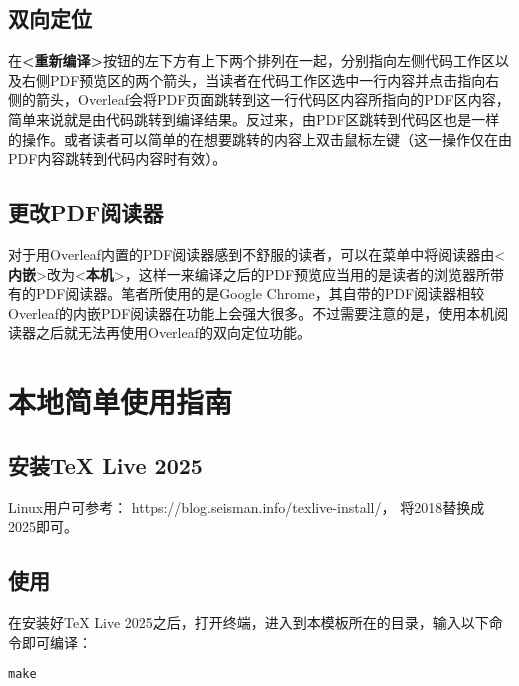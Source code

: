 \subsection{双向定位}

在\textbf{<重新编译>}按钮的左下方有上下两个排列在一起，分别指向左侧代码工作区以及右侧PDF预览区的两个箭头，当读者在代码工作区选中一行内容并点击指向右侧的箭头，Overleaf会将PDF页面跳转到这一行代码区内容所指向的PDF区内容，简单来说就是由代码跳转到编译结果。反过来，由PDF区跳转到代码区也是一样的操作。或者读者可以简单的在想要跳转的内容上双击鼠标左键（这一操作仅在由PDF内容跳转到代码内容时有效）。

\subsection{更改PDF阅读器}

对于用Overleaf内置的PDF阅读器感到不舒服的读者，可以在菜单中将阅读器由<\textbf{内嵌}>改为<\textbf{本机}>，这样一来编译之后的PDF预览应当用的是读者的浏览器所带有的PDF阅读器。笔者所使用的是Google Chrome，其自带的PDF阅读器相较Overleaf的内嵌PDF阅读器在功能上会强大很多。不过需要注意的是，使用本机阅读器之后就无法再使用Overleaf的双向定位功能。

\section{本地简单使用指南}
\subsection{安装TeX Live 2025}
Linux用户可参考：
https://blog.seisman.info/texlive-install/， 将2018替换成2025即可。

\subsection{使用}
在安装好TeX Live 2025之后，打开终端，进入到本模板所在的目录，输入以下命令即可编译：
\begin{verbatim}
make
\end{verbatim}